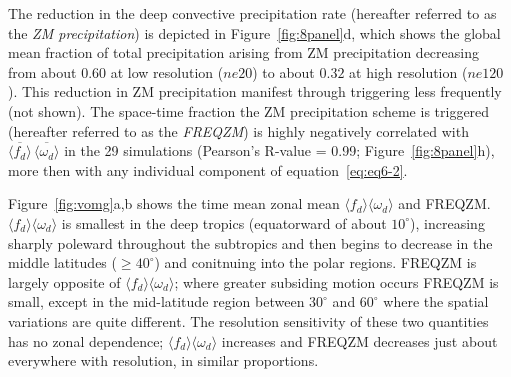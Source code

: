 The reduction in the \cite{ZM1995AO} deep convective precipitation rate (hereafter referred to as the {\em{ZM precipitation}}) is depicted in Figure~\ref{fig:8panel}d, which shows the global mean fraction of total precipitation arising from ZM precipitation decreasing from about $0.60$ at low resolution ($ne20$) to about $0.32$ at high resolution ($ne120$). This reduction in ZM precipitation manifest through triggering less frequently (not shown). The space-time fraction the ZM precipitation scheme is triggered (hereafter referred to as the {\em{FREQZM}}) is highly negatively correlated with $\overline{\langle f_{d} \rangle} \, \overline{\langle \omega_{d} \rangle}$ in the 29 simulations (Pearson's R-value = 0.99; Figure~\ref{fig:8panel}h), more then with any individual component of equation~\ref{eq:eq6-2}.

Figure~\ref{fig:vomg}a,b shows the time mean zonal mean $\langle f_{d} \rangle \langle \omega_{d} \rangle$ and FREQZM. $\langle f_{d} \rangle \langle \omega_{d} \rangle$ is smallest in the deep tropics (equatorward of about $10^{\circ}$), increasing sharply poleward throughout the subtropics and then begins to decrease in the middle latitudes ($\geq 40^{\circ}$) and conitnuing into the polar regions. FREQZM is largely opposite of $\langle f_{d} \rangle \langle \omega_{d} \rangle$; where greater subsiding motion occurs FREQZM is small, except in the mid-latitude region between $30^{\circ}$ and $60^{\circ}$ where the spatial variations are quite different. The resolution sensitivity of these two quantities has no zonal dependence; $\langle f_{d} \rangle \langle \omega_{d} \rangle$ increases and FREQZM decreases just about everywhere with resolution, in similar proportions.


